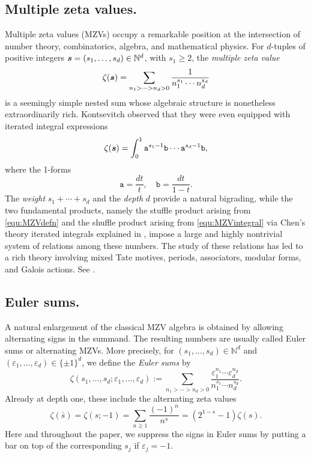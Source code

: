 \documentclass{article}
\newcommand\ta{{\texttt{a}}}
\newcommand\tb{{\texttt{b}}}
\newcommand\eps{{\varepsilon}}
\newcommand{\bfs}{{\boldsymbol{\sl{s}}}}
\newcommand{\N}{\mathbb{N}}
\theoremstyle{plain}
\theoremstyle{definition}
\begin{document}
\subsection{Multiple zeta values.}
Multiple zeta values (MZVs) occupy a remarkable position at the intersection of number theory, combinatorics, algebra, and mathematical physics. For $d$-tuples of positive integers $\bfs=(s_1,\dots,s_d)\in\N^d$, with $s_1\geq 2$, the \emph{multiple zeta value}
\begin{equation}\label{equ:MZVdefn}
\zeta(\bfs)=\sum_{n_1>\cdots>n_d>0} \frac{1}{n_1^{s_1}\cdots n_d^{s_d}}
\end{equation}
is a seemingly simple nested sum whose algebraic structure is nonetheless extraordinarily rich. Kontsevitch observed that they were even equipped with
iterated integral expressions
\begin{equation}\label{equ:MZVintegral}
\zeta(\bfs)=\int_0^1 \ta^{s_1-1} \tb\cdots \ta^{s_d-1} \tb,
\end{equation}
where the 1-forms
\begin{equation*}
    \ta=\frac{dt}{t},\quad   \tb=\frac{dt}{1-t}.
\end{equation*}
The \emph{weight} $s_1+\cdots+s_d$ and the \emph{depth} $d$ provide a natural bigrading, while the two fundamental products, namely the stuffle product arising from \eqref{equ:MZVdefn} and the shuffle product arising from \eqref{equ:MZVintegral} via Chen's theory iterated integrals explained in \cite{KTChen1971,KTChen1977}, impose a large and highly nontrivial system of relations among these numbers. The study of these relations has led to a rich theory involving mixed Tate motives, periods, associators, modular forms, and Galois actions. See \cite{Brown2012,GanglKaZa2006,Glanois2015,Kemp2026,Racinet2002,Zagier1994}.


\subsection{Euler sums.}
A natural enlargement of the classical MZV algebra is obtained by allowing alternating signs in the summand. The resulting numbers are usually called Euler sums or alternating MZVs. More precisely, for $(s_1,\dots,s_d)\in\N^d$ and $(\eps_1,\dots,\eps_d)\in\{\pm 1\}^d$, we define the \emph{Euler sums} by
\begin{equation*}
\zeta(s_1,\dots,s_d;\eps_1,\dots,\eps_d):=\sum_{n_1>\cdots>n_d>0}\frac{\eps_1^{n_1}\cdots\eps_d^{n_d}}{n_1^{s_1}\cdots n_d^{s_d}}.
\end{equation*}
Already at depth one, these include the alternating zeta values
\begin{equation}\label{equ:ESdepth1}
\zeta(\bar{s})=\zeta(s;-1)=\sum_{n\geq1}\frac{(-1)^{n}}{n^s}=(2^{1-s}-1)\zeta(s).
\end{equation}
Here and throughout the paper, we suppress the signs in Euler sums by putting a bar on top of the corresponding $s_j$ if $\eps_j=-1$.
\end{document}
